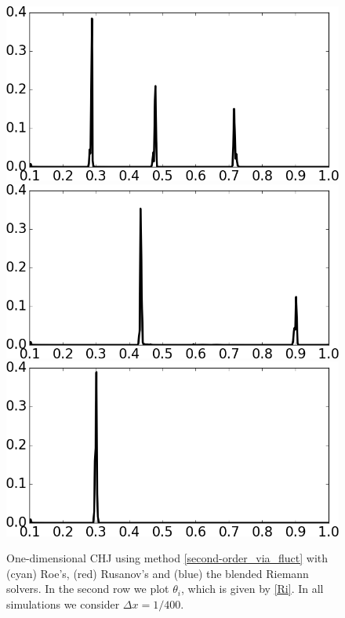 \documentclass[preprint, 11pt]{article}
\begin{document}
\begin{figure}[!h]
{    \vspace{15pt}
    \includegraphics[scale=0.29]{figures/chj_1D_Ri_t0p5.png}
    \qquad
    \includegraphics[scale=0.29]{figures/chj_1D_Ri_t1p3.png}
    \qquad
    \includegraphics[scale=0.29]{figures/chj_1D_Ri_t10p0.png}
  }
  \caption{
    One-dimensional CHJ using method \eqref{second-order_via_fluct} with
    (cyan) Roe's, (red) Rusanov's and (blue) the blended Riemann solvers.
    In the second row we plot $\theta_i$, which is given by \eqref{Ri}.
    In all simulations we consider $\Delta x=1/400$.
    \label{fig:1D_chj}}
\end{figure}
\end{document}

